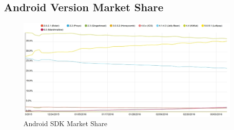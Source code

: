 \begin{landscape}
\chapter{Android Version Market Share}
\label{appendix:sdkmarketshare}

\begin{figure}[ht]
	\centering
	\includegraphics[scale=0.6]{images/AndroidSDKMarketShare.jpg}
	\caption{Android SDK Market Share \citep{appbrainsdkversions}}
\end{figure}
\end{landscape}